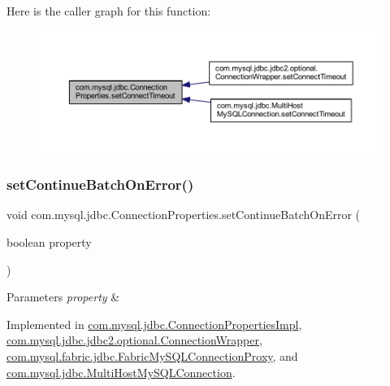 Here is the caller graph for this function\+:\nopagebreak
\begin{figure}[H]
\begin{center}
\leavevmode
\includegraphics[width=350pt]{interfacecom_1_1mysql_1_1jdbc_1_1_connection_properties_af58263721d45c09ec3bdbccc1041e1df_icgraph}
\end{center}
\end{figure}
\mbox{\label{interfacecom_1_1mysql_1_1jdbc_1_1_connection_properties_a5f3f94fedf8c3162e2b825279a9d01ed}} 
\subsubsection{\texorpdfstring{set\+Continue\+Batch\+On\+Error()}{setContinueBatchOnError()}}
{\footnotesize\ttfamily void com.\+mysql.\+jdbc.\+Connection\+Properties.\+set\+Continue\+Batch\+On\+Error (\begin{DoxyParamCaption}\item[{boolean}]{property }\end{DoxyParamCaption})}


\begin{DoxyParams}{Parameters}
{\em property} & \\
\hline
\end{DoxyParams}


Implemented in \mbox{\hyperlink{classcom_1_1mysql_1_1jdbc_1_1_connection_properties_impl_aae01ab8d689f6a5e5450fb4609794bf0}{com.\+mysql.\+jdbc.\+Connection\+Properties\+Impl}}, \mbox{\hyperlink{classcom_1_1mysql_1_1jdbc_1_1jdbc2_1_1optional_1_1_connection_wrapper_a0d0494da50a007f3aea31ada724385d9}{com.\+mysql.\+jdbc.\+jdbc2.\+optional.\+Connection\+Wrapper}}, \mbox{\hyperlink{classcom_1_1mysql_1_1fabric_1_1jdbc_1_1_fabric_my_s_q_l_connection_proxy_a721b4bc4c95a2371c4abe375d63aaa82}{com.\+mysql.\+fabric.\+jdbc.\+Fabric\+My\+S\+Q\+L\+Connection\+Proxy}}, and \mbox{\hyperlink{classcom_1_1mysql_1_1jdbc_1_1_multi_host_my_s_q_l_connection_a99f0b12351ec3cb5353af259a71bae1c}{com.\+mysql.\+jdbc.\+Multi\+Host\+My\+S\+Q\+L\+Connection}}.

